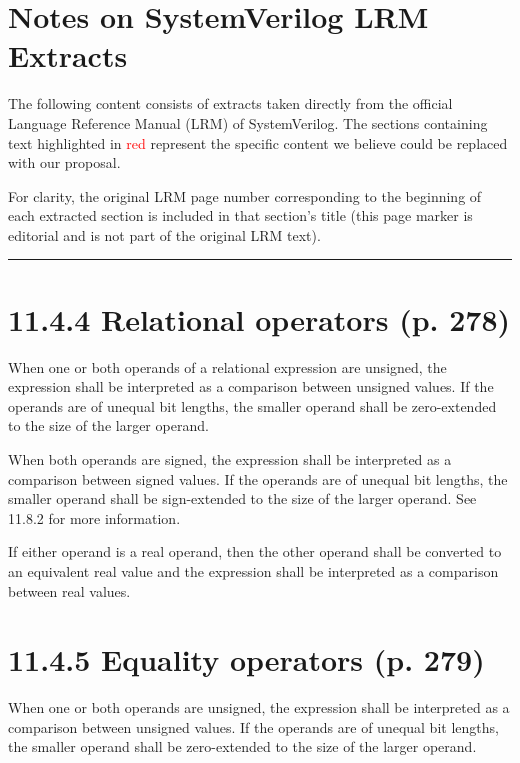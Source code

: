 \documentclass{article}
\begin{document}
\section*{Notes on SystemVerilog LRM Extracts}

The following content consists of extracts taken directly from the official
Language Reference Manual (LRM) of SystemVerilog. The sections containing text
highlighted in \textcolor{red}{red} represent the specific content we believe
could be replaced with our proposal.

For clarity, the original LRM page number corresponding to the beginning of each
extracted section is included in that section's title (this page marker is
editorial and is not part of the original LRM text).

\begin{center}
\noindent\rule{.8\textwidth}{1pt}  
\end{center}

\section*{11.4.4 Relational operators (p. 278)}

\textelp{}

When one or both operands of a relational expression are unsigned, the
expression shall be interpreted as a comparison between unsigned values.
  {
    \color{red}
    If the operands are of unequal bit lengths, the smaller operand
    shall be zero-extended to the size of the larger operand.
  }

When both operands are signed, the expression shall be interpreted as a
comparison between signed values.
  {
    \color{red}
    If the operands are of unequal bit
    lengths, the smaller operand shall be sign-extended to the size of the larger
    operand. See 11.8.2 for more information.
  }

If either operand is a real operand, then the other operand shall be converted to
an equivalent real value and the expression shall be interpreted as a comparison
between real values.

\textelp{}

\section*{11.4.5 Equality operators (p. 279)}

\textelp{}

When one or both operands are unsigned, the expression shall be interpreted as a
comparison between unsigned values.
  {
    \color{red}
    If the operands are of unequal bit
    lengths, the smaller operand shall be zero-extended to the size of the larger
    operand.
  }
\end{document}

